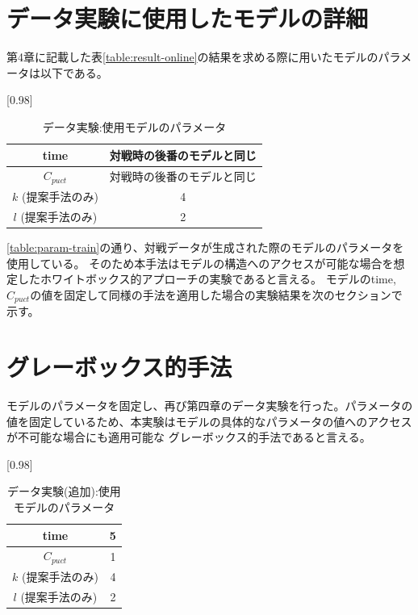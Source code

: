 \section{データ実験に使用したモデルの詳細}
第4章に記載した表\ref{table:result-online}の結果を求める際に用いたモデルのパラメータは以下である。
\begin{table}[H]
	\caption{データ実験:使用モデルのパラメータ}
	\centering
	\scalebox{0.98}[0.98]{
		\begin{tabular}{c|c}
			
			time    & 対戦時の後番のモデルと同じ \\ \hline
			$C_{puct}$    & 対戦時の後番のモデルと同じ \\
			$k$ (提案手法のみ)     & 4 \\
			$l$ (提案手法のみ)     & 2 \\
		\end{tabular}
	}
	\label{table:param-data}
\end{table}

\ref{table:param-train}の通り、対戦データが生成された際のモデルのパラメータを使用している。
そのため本手法はモデルの構造へのアクセスが可能な場合を想定したホワイトボックス的アプローチの実験であると言える。
モデルのtime, $C_{puct}$の値を固定して同様の手法を適用した場合の実験結果を次のセクションで示す。
\section{グレーボックス的手法}
モデルのパラメータを固定し、再び第四章のデータ実験を行った。パラメータの値を固定しているため、本実験はモデルの具体的なパラメータの値へのアクセスが不可能な場合にも適用可能な
グレーボックス的手法であると言える。
\begin{table}[H]
	\caption{データ実験(追加):使用モデルのパラメータ}
	\centering
	\scalebox{0.98}[0.98]{
		\begin{tabular}{c|c}
			
			time    & 5 \\ \hline
			$C_{puct}$    & 1 \\
			$k$ (提案手法のみ)     & 4 \\
			$l$ (提案手法のみ)     & 2 \\
		\end{tabular}
	}
	\label{table:param-data-extra}
\end{table}

